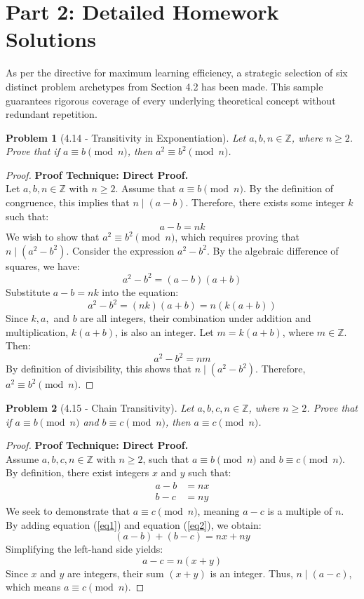 \documentclass[11pt]{article}
\newtheorem{problem}{Problem}
\begin{document}
\newpage
\section{Part 2: Detailed Homework Solutions}

As per the directive for maximum learning efficiency, a strategic selection of six distinct problem archetypes from Section 4.2 has been made. This sample guarantees rigorous coverage of every underlying theoretical concept without redundant repetition.

\begin{problem}[4.14 - Transitivity in Exponentiation]
Let $a, b, n \in \mathbb{Z}$, where $n \ge 2$. Prove that if $a \equiv b \pmod n$, then $a^2 \equiv b^2 \pmod n$.
\end{problem}
\begin{proof}
\textbf{Proof Technique: Direct Proof.} \\
Let $a, b, n \in \mathbb{Z}$ with $n \ge 2$. Assume that $a \equiv b \pmod n$. 
By the definition of congruence, this implies that $n \mid (a - b)$. 
Therefore, there exists some integer $k$ such that:
\[ a - b = nk \]
We wish to show that $a^2 \equiv b^2 \pmod n$, which requires proving that $n \mid (a^2 - b^2)$.
Consider the expression $a^2 - b^2$. By the algebraic difference of squares, we have:
\[ a^2 - b^2 = (a - b)(a + b) \]
Substitute $a - b = nk$ into the equation:
\[ a^2 - b^2 = (nk)(a + b) = n(k(a + b)) \]
Since $k, a,$ and $b$ are all integers, their combination under addition and multiplication, $k(a+b)$, is also an integer. Let $m = k(a+b)$, where $m \in \mathbb{Z}$. Then:
\[ a^2 - b^2 = nm \]
By definition of divisibility, this shows that $n \mid (a^2 - b^2)$. Therefore, $a^2 \equiv b^2 \pmod n$.
\end{proof}

\begin{problem}[4.15 - Chain Transitivity]
Let $a, b, c, n \in \mathbb{Z}$, where $n \ge 2$. Prove that if $a \equiv b \pmod n$ and $b \equiv c \pmod n$, then $a \equiv c \pmod n$.
\end{problem}
\begin{proof}
\textbf{Proof Technique: Direct Proof.} \\
Assume $a, b, c, n \in \mathbb{Z}$ with $n \ge 2$, such that $a \equiv b \pmod n$ and $b \equiv c \pmod n$. 
By definition, there exist integers $x$ and $y$ such that:
\begin{align}
    a - b &= nx \label{eq1} \\
    b - c &= ny \label{eq2}
\end{align}
We seek to demonstrate that $a \equiv c \pmod n$, meaning $a - c$ is a multiple of $n$.
By adding equation (\ref{eq1}) and equation (\ref{eq2}), we obtain:
\[ (a - b) + (b - c) = nx + ny \]
Simplifying the left-hand side yields:
\[ a - c = n(x + y) \]
Since $x$ and $y$ are integers, their sum $(x + y)$ is an integer. Thus, $n \mid (a - c)$, which means $a \equiv c \pmod n$.
\end{proof}
\end{document}
